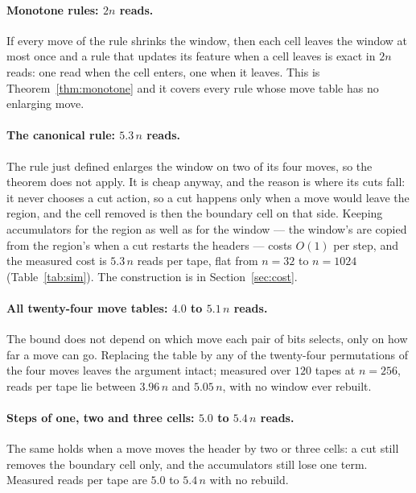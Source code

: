 \documentclass[11pt]{article}
\begin{document}
\paragraph{Monotone rules: $2n$ reads.} If every move of the rule shrinks the window, then each cell
leaves the window at most once and a rule that updates its feature when a cell leaves is exact in $2n$
reads: one read when the cell enters, one when it leaves. This is Theorem~\ref{thm:monotone} and it
covers every rule whose move table has no enlarging move.

\paragraph{The canonical rule: $5.3\,n$ reads.} The rule just defined enlarges the window
on two of its four moves, so the theorem does not apply. It is cheap anyway, and the reason is where
its cuts fall: it never chooses a cut action, so a cut happens only when a move would leave the
region, and the cell removed is then the boundary cell on that side. Keeping accumulators for the
region as well as for the window --- the window's are copied from the region's when a cut restarts the
headers --- costs $O(1)$ per step, and the measured cost is $5.3\,n$ reads per tape, flat from $n=32$
to $n=1024$ (Table~\ref{tab:sim}). The construction is in Section~\ref{sec:cost}.

\paragraph{All twenty-four move tables: $4.0$ to $5.1\,n$ reads.} The bound does not depend on which move
each pair of bits selects, only on how far a move can go. Replacing the table by any of the twenty-four
permutations of the four moves leaves the argument intact; measured over $120$ tapes at $n=256$, reads
per tape lie between $3.96\,n$ and $5.05\,n$, with no window ever rebuilt.

\paragraph{Steps of one, two and three cells: $5.0$ to $5.4\,n$ reads.} The same holds when a move moves
the header by two or three cells: a cut still removes the boundary cell only, and the accumulators still
lose one term. Measured reads per tape are $5.0$ to $5.4\,n$ with no rebuild.
\end{document}
